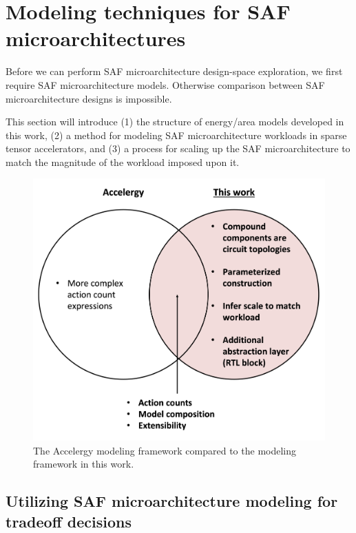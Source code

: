 \chapter{Modeling techniques for SAF microarchitectures}
\label{chapter:modeling}

Before we can perform SAF microarchitecture design-space exploration, we first require SAF microarchitecture models. Otherwise comparison between SAF microarchitecture designs is impossible.

This section will introduce (1) the structure of energy/area models developed in this work, (2) a method for modeling SAF microarchitecture workloads in sparse tensor accelerators, and (3) a process for scaling up the SAF microarchitecture to match the magnitude of the workload imposed upon it.

\begin{figure}[h]
\includegraphics[width=\textwidth]{figures/accelergy_comparison.png}
\caption{The Accelergy modeling framework compared to the modeling framework in this work.}
\label{fig:accelergy_comparison}
\end{figure}

\section{Utilizing SAF microarchitecture modeling for tradeoff decisions}



